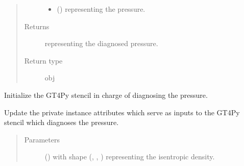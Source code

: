 \documentclass[letterpaper,10pt,english]{sphinxmanual}
\begin{document}
\begin{fulllineitems}
\begin{fulllineitems}
\begin{quote}
\begin{description}
\begin{itemize}
\item {} 
 () \textendash{}  representing the pressure.

\end{itemize}

\item[{Returns}] \leavevmode
{} representing the diagnosed pressure.

\item[{Return type}] \leavevmode
obj

\end{description}\end{quote}

\end{fulllineitems}


\begin{fulllineitems}
\label{\detokenize{api:tasmania.dycore.diagnostic_isentropic.DiagnosticIsentropic._stencil_diagnosing_air_pressure_initialize}}
Initialize the GT4Py stencil in charge of diagnosing the pressure.

\end{fulllineitems}


\begin{fulllineitems}
\label{\detokenize{api:tasmania.dycore.diagnostic_isentropic.DiagnosticIsentropic._stencil_diagnosing_air_pressure_set_inputs}}
Update the private instance attributes which serve as inputs to the GT4Py stencil which diagnoses the pressure.
\begin{quote}\begin{description}
\item[{Parameters}] \leavevmode
{} () \textendash{}  with shape (, , ) representing the isentropic density.


\end{description}
\end{quote}
\end{fulllineitems}
\end{fulllineitems}
\end{document}
